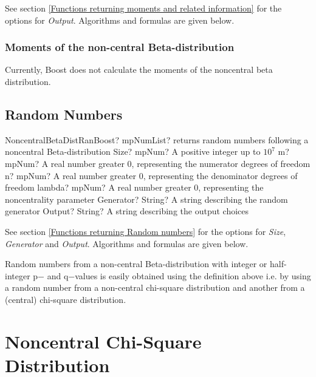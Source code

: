 \vspace{0.3cm}

See section \ref{Functions returning moments and related information} for the options for {\itshape\sffamily Output}. Algorithms and formulas are given below.

\subsubsection{Moments of the non-central Beta-distribution}
Currently, Boost does not calculate the moments of the noncentral beta distribution. 



\subsection{Random Numbers}

\begin{mpFunctionsExtract}
	\mpFunctionSix
	{NoncentralBetaDistRanBoost? mpNumList? returns random numbers following a noncentral Beta-distribution}
	{Size? mpNum? A positive integer up to $10^7$}
	{m? mpNum? A real number greater 0, representing the numerator  degrees of freedom}
	{n? mpNum? A real number greater 0, representing the denominator degrees of freedom}
	{lambda? mpNum? A real number greater 0, representing the noncentrality parameter}
	{Generator? String? A string describing the random generator}
	{Output? String? A string describing the output choices}
\end{mpFunctionsExtract}

\vspace{0.3cm}
See section \ref{Functions returning Random numbers} for the options for  {\itshape\sffamily Size},  {\itshape\sffamily Generator} and {\itshape\sffamily Output}. Algorithms and formulas are given below.

\vspace{0.3cm}
Random numbers from a non-central Beta-distribution with integer or half-integer p− and q−values is easily obtained using the definition above i.e. by using a random number from a non-central chi-square distribution and another from a (central) chi-square distribution.



\section{Noncentral Chi-Square Distribution}
\label{NoncentralChiSquareDistribution}


